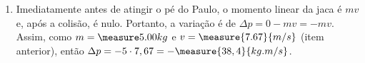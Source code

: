 \begin{question}
\begin{solution}
\begin{enumerate}
			\item Imediatamente antes de atingir o pé do Paulo, o momento linear da jaca é $mv$ e, após a colisão, é nulo.
			Portanto, a variação é de $\Delta p = 0 - mv = -mv$.
			Assim, como $m = \MASS$ e $v = \measure{7.67}{m/s}$ (item anterior), então $\Delta p = -5 \cdot 7,67 = -\measure{38,4}{kg.m/s}$.

		\end{enumerate}
	\end{solution}
\end{question}

\begin{comment}

```python
from math import sqrt

# Item (a)
def question_10A_a(h, m, dt, g = 9.81):
	return sqrt(2*g*h)

# Item (b)
def question_10A_b(h, m, dt, g = 9.81):
	v = question_10A_a(h, m, dt, g)
	return(-m*v)

# Item (c)
def question_10A_c(h, m, dt, g = 9.81):
	dp = question_10A_b(h, m, dt, g)
	return(dp/dt)
```
\end{comment}